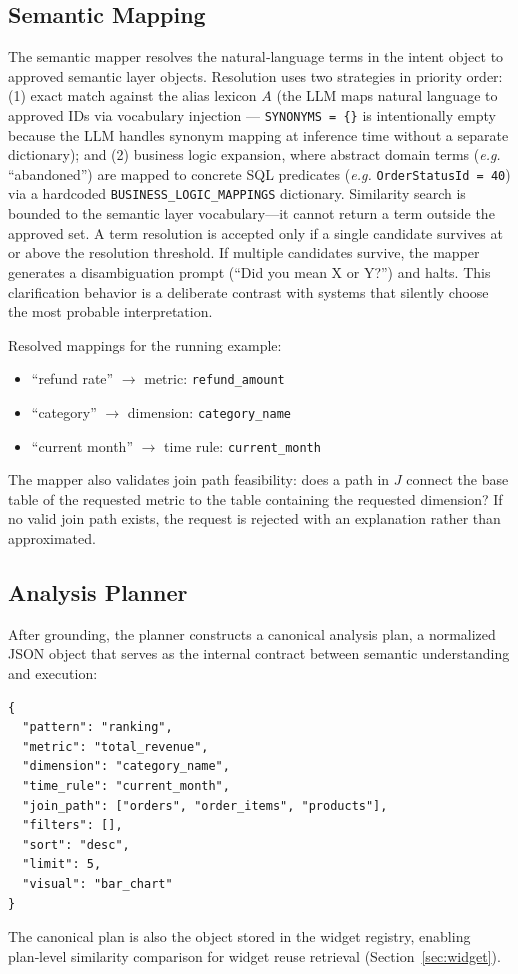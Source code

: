 \documentclass[11pt]{article}
\begin{document}
\subsection{Semantic Mapping}
The semantic mapper resolves the natural‑language terms in the intent object to approved semantic layer objects. Resolution uses two strategies in priority order: (1) exact match against the alias lexicon $A$ (the LLM maps natural language to approved IDs via vocabulary injection --- \texttt{SYNONYMS = \{\}} is intentionally empty because the LLM handles synonym mapping at inference time without a separate dictionary); and (2) business logic expansion, where abstract domain terms (\textit{e.g.} ``abandoned'') are mapped to concrete SQL predicates (\textit{e.g.} \texttt{OrderStatusId = 40}) via a hardcoded \texttt{BUSINESS\_LOGIC\_MAPPINGS} dictionary. Similarity search is bounded to the semantic layer vocabulary—it cannot return a term outside the approved set. A term resolution is accepted only if a single candidate survives at or above the resolution threshold. If multiple candidates survive, the mapper generates a disambiguation prompt (``Did you mean X or Y?'') and halts. This clarification behavior is a deliberate contrast with systems that silently choose the most probable interpretation.

Resolved mappings for the running example:
\begin{itemize}
  \item ``refund rate'' $\rightarrow$ metric: \texttt{refund\_amount}
  \item ``category'' $\rightarrow$ dimension: \texttt{category\_name}
  \item ``current month'' $\rightarrow$ time rule: \texttt{current\_month}
\end{itemize}
The mapper also validates join path feasibility: does a path in $J$ connect the base table of the requested metric to the table containing the requested dimension? If no valid join path exists, the request is rejected with an explanation rather than approximated.

\subsection{Analysis Planner}
After grounding, the planner constructs a canonical analysis plan, a normalized JSON object that serves as the internal contract between semantic understanding and execution:
\begin{verbatim}
{
  "pattern": "ranking",
  "metric": "total_revenue",
  "dimension": "category_name",
  "time_rule": "current_month",
  "join_path": ["orders", "order_items", "products"],
  "filters": [],
  "sort": "desc",
  "limit": 5,
  "visual": "bar_chart"
}
\end{verbatim}
The canonical plan is also the object stored in the widget registry, enabling plan‑level similarity comparison for widget reuse retrieval (Section~\ref{sec:widget}).
\end{document}
